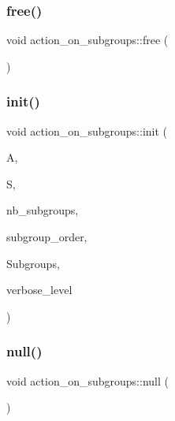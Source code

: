 \mbox{\label{classaction__on__subgroups_a60809c7ad139a3e98758048a0e0e6c97}} 
\subsubsection{\texorpdfstring{free()}{free()}}
{\footnotesize\ttfamily void action\+\_\+on\+\_\+subgroups\+::free (\begin{DoxyParamCaption}{ }\end{DoxyParamCaption})}

\mbox{\label{classaction__on__subgroups_af974b4d4a7b840fe84009db7de78f261}} 
\subsubsection{\texorpdfstring{init()}{init()}}
{\footnotesize\ttfamily void action\+\_\+on\+\_\+subgroups\+::init (\begin{DoxyParamCaption}\item[{\mbox{\hyperlink{classaction}{action}} $\ast$}]{A,  }\item[{\mbox{\hyperlink{classsims}{sims}} $\ast$}]{S,  }\item[{\mbox{\hyperlink{galois_8h_a09fddde158a3a20bd2dcadb609de11dc}{I\+NT}}}]{nb\+\_\+subgroups,  }\item[{\mbox{\hyperlink{galois_8h_a09fddde158a3a20bd2dcadb609de11dc}{I\+NT}}}]{subgroup\+\_\+order,  }\item[{\mbox{\hyperlink{classsubgroup}{subgroup}} $\ast$$\ast$}]{Subgroups,  }\item[{\mbox{\hyperlink{galois_8h_a09fddde158a3a20bd2dcadb609de11dc}{I\+NT}}}]{verbose\+\_\+level }\end{DoxyParamCaption})}

\mbox{\label{classaction__on__subgroups_ada42c75d9ba6148fb2c10d1e7e59f4be}} 
\subsubsection{\texorpdfstring{null()}{null()}}
{\footnotesize\ttfamily void action\+\_\+on\+\_\+subgroups\+::null (\begin{DoxyParamCaption}{ }\end{DoxyParamCaption})}



